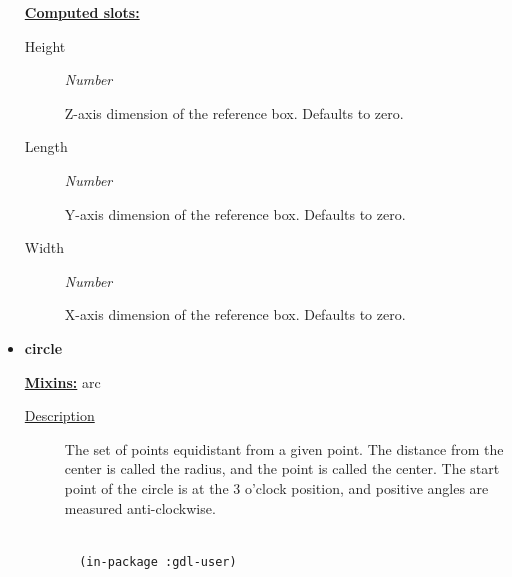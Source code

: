 \documentclass [11pt]{book}
\begin{document}
\begin{itemize}
\textbf{
\underline{Computed slots:}}

\begin{description}

\item [Height]
\emph{Number}

 Z-axis dimension of the reference box. Defaults to zero.




\item [Length]
\emph{Number}

 Y-axis dimension of the reference box. Defaults to zero.




\item [Width]
\emph{Number}

 X-axis dimension of the reference box. Defaults to zero.




\end{description}







\item {}
\label{prim:circle}
\textbf{circle}


\textbf{
\underline{Mixins:}} arc





\begin{description}

\item [
\underline{Description}]


The set of points equidistant from a given point. 
The distance from the center is called the radius, and the point is called 
the center. The start point of the circle is at the 3 o'clock position, and positive
angles are measured anti-clockwise.



\end{description}




\begin{figure}
\begin{lrbox}{\boxedverb}
\begin{minipage}{\linewidth}
{\small

\begin{verbatim}

  (in-package :gdl-user)
                  

\end{verbatim}}
\end{minipage}
\end{lrbox}
\end{figure}
\end{itemize}
\end{document}
